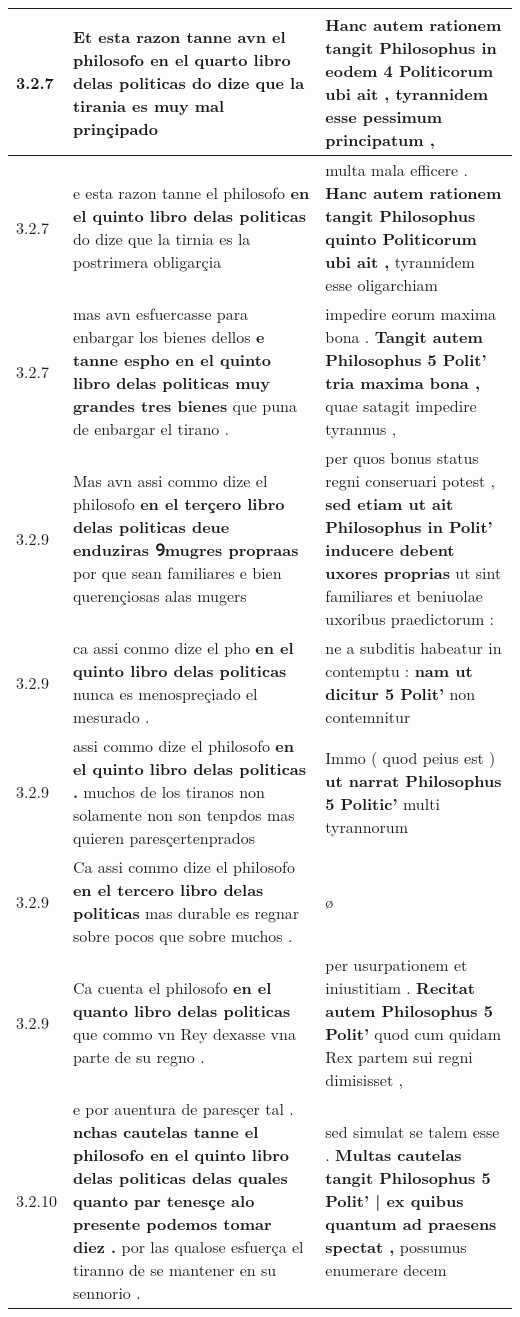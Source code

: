 \begin{tabular}{|p{1cm}|p{6.5cm}|p{6.5cm}|}
3.2.7 & Et esta razon tanne avn el philosofo \textbf{ en el quarto libro delas politicas } do dize que la tirania es muy mal prinçipado & Hanc autem rationem tangit Philosophus \textbf{ in eodem 4 Politicorum ubi ait , } tyrannidem esse pessimum principatum , \\\hline
3.2.7 & e esta razon tanne el philosofo \textbf{ en el quinto libro delas politicas } do dize que la tirnia es la postrimera obligarçia & multa mala efficere . \textbf{ Hanc autem rationem tangit Philosophus quinto Politicorum ubi ait , } tyrannidem esse oligarchiam \\\hline
3.2.7 & mas avn esfuercasse para enbargar los bienes dellos \textbf{ e tanne espho en el quinto libro delas politicas muy grandes tres bienes } que puna de enbargar el tirano . & impedire eorum maxima bona . \textbf{ Tangit autem Philosophus 5 Polit’ tria maxima bona , } quae satagit impedire tyrannus , \\\hline
3.2.9 & Mas avn assi commo dize el philosofo \textbf{ en el terçero libro delas politicas deue enduziras Ꝯmugres propraas } por que sean familiares e bien querençiosas alas mugers & per quos bonus status regni conseruari potest , \textbf{ sed etiam ut ait Philosophus in Polit’ inducere debent uxores proprias } ut sint familiares et beniuolae uxoribus praedictorum : \\\hline
3.2.9 & ca assi conmo dize el pho \textbf{ en el quinto libro delas politicas } nunca es menospreçiado el mesurado . & ne a subditis habeatur in contemptu : \textbf{ nam ut dicitur 5 Polit’ } non contemnitur \\\hline
3.2.9 & assi commo dize el philosofo \textbf{ en el quinto libro delas politicas . } muchos de los tiranos non solamente non son tenpdos mas quieren paresçertenprados & Immo ( quod peius est ) \textbf{ ut narrat Philosophus 5 Politic’ } multi tyrannorum \\\hline
3.2.9 & Ca assi commo dize el philosofo \textbf{ en el tercero libro delas politicas } mas durable es regnar sobre pocos que sobre muchos . & ø \\\hline
3.2.9 & Ca cuenta el philosofo \textbf{ en el quanto libro delas politicas } que commo vn Rey dexasse vna parte de su regno . & per usurpationem et iniustitiam . \textbf{ Recitat autem Philosophus 5 Polit’ } quod cum quidam Rex partem sui regni dimisisset , \\\hline
3.2.10 & e por auentura de paresçer tal . \textbf{ nchas cautelas tanne el philosofo en el quinto libro delas politicas delas quales quanto par tenesçe alo presente podemos tomar diez . } por las qualose esfuerça el tiranno de se mantener en su sennorio . & sed simulat se talem esse . \textbf{ Multas cautelas tangit Philosophus 5 Polit’ | ex quibus quantum ad praesens spectat , } possumus enumerare decem \\\hline

\end{tabular}
